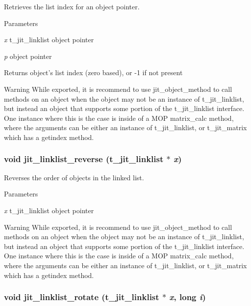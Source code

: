 Retrieves the list index for an object pointer. 
\begin{DoxyParams}{Parameters}
\item[{\em x}]t\_\-jit\_\-linklist object pointer \item[{\em p}]object pointer\end{DoxyParams}
\begin{DoxyReturn}{Returns}
object's list index (zero based), or -\/1 if not present
\end{DoxyReturn}
\begin{DoxyWarning}{Warning}
While exported, it is recommend to use jit\_\-object\_\-method to call methods on an object when the object may not be an instance of t\_\-jit\_\-linklist, but instead an object that supports some portion of the t\_\-jit\_\-linklist interface. One instance where this is the case is inside of a MOP matrix\_\-calc method, where the arguments can be either an instance of t\_\-jit\_\-linklist, or t\_\-jit\_\-matrix which has a getindex method. 
\end{DoxyWarning}
\hypertarget{group__linklistmod_gaba23e6020b0364064707661e188037ac}{
\subsubsection[{jit\_\-linklist\_\-reverse}]{\setlength{\rightskip}{0pt plus 5cm}void jit\_\-linklist\_\-reverse (t\_\-jit\_\-linklist $\ast$ {\em x})}}
\label{group__linklistmod_gaba23e6020b0364064707661e188037ac}


Reverses the order of objects in the linked list. 
\begin{DoxyParams}{Parameters}
\item[{\em x}]t\_\-jit\_\-linklist object pointer\end{DoxyParams}
\begin{DoxyWarning}{Warning}
While exported, it is recommend to use jit\_\-object\_\-method to call methods on an object when the object may not be an instance of t\_\-jit\_\-linklist, but instead an object that supports some portion of the t\_\-jit\_\-linklist interface. One instance where this is the case is inside of a MOP matrix\_\-calc method, where the arguments can be either an instance of t\_\-jit\_\-linklist, or t\_\-jit\_\-matrix which has a getindex method. 
\end{DoxyWarning}
\hypertarget{group__linklistmod_ga596c1db3539f73b998755bcb46296111}{
\subsubsection[{jit\_\-linklist\_\-rotate}]{\setlength{\rightskip}{0pt plus 5cm}void jit\_\-linklist\_\-rotate (t\_\-jit\_\-linklist $\ast$ {\em x}, \/  long {\em i})}}
\label{group__linklistmod_ga596c1db3539f73b998755bcb46296111}


